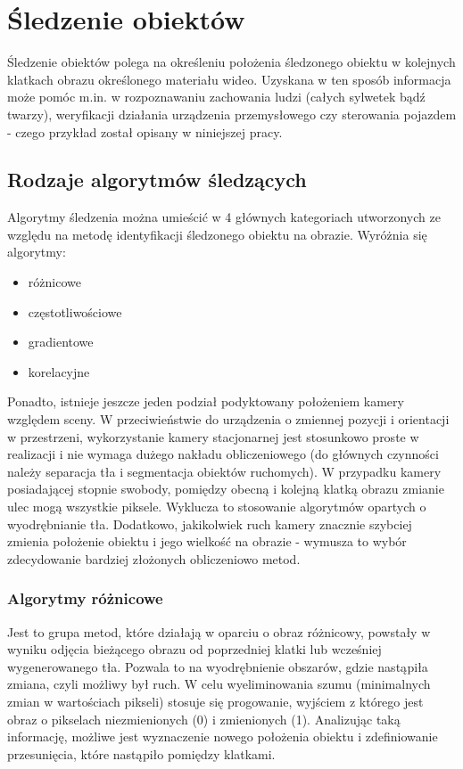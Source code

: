 \chapter{Śledzenie obiektów}
\label{cha:sledzenieObiektow}

Śledzenie obiektów polega na określeniu położenia śledzonego obiektu w kolejnych klatkach obrazu określonego materiału wideo. Uzyskana w ten sposób informacja może pomóc m.in. w rozpoznawaniu zachowania ludzi (całych sylwetek bądź twarzy), weryfikacji działania urządzenia przemysłowego czy sterowania pojazdem - czego przykład został opisany w niniejszej pracy.


\section{Rodzaje algorytmów śledzących}
\label{sec:algorytmySledzace}

Algorytmy śledzenia można umieścić w 4 głównych kategoriach utworzonych ze względu na metodę identyfikacji śledzonego obiektu na obrazie. Wyróżnia się algorytmy:
\begin{itemize}
	\item różnicowe
	\item częstotliwościowe
	\item gradientowe
	\item korelacyjne
\end{itemize}

Ponadto, istnieje jeszcze jeden podział podyktowany położeniem kamery względem sceny. W przeciwieństwie do urządzenia o zmiennej pozycji i orientacji w przestrzeni, wykorzystanie kamery stacjonarnej jest stosunkowo proste w realizacji i nie wymaga dużego nakładu obliczeniowego (do głównych czynności należy separacja tła i segmentacja obiektów ruchomych). W przypadku kamery posiadającej stopnie swobody, pomiędzy obecną i kolejną klatką obrazu zmianie ulec mogą wszystkie piksele. Wyklucza to stosowanie algorytmów opartych o wyodrębnianie tła. Dodatkowo, jakikolwiek ruch kamery  znacznie szybciej zmienia położenie obiektu i jego wielkość na obrazie - wymusza to wybór zdecydowanie bardziej złożonych obliczeniowo metod.

\subsection{Algorytmy różnicowe}
Jest to grupa metod, które działają w oparciu o obraz różnicowy, powstały w wyniku odjęcia bieżącego obrazu od poprzedniej klatki lub wcześniej wygenerowanego tła. Pozwala to na wyodrębnienie obszarów, gdzie nastąpiła zmiana, czyli możliwy był ruch. W celu wyeliminowania szumu (minimalnych zmian w wartościach pikseli) stosuje się progowanie, wyjściem z którego jest obraz o pikselach niezmienionych (0) i zmienionych (1). Analizując taką informację, możliwe jest wyznaczenie nowego położenia obiektu i zdefiniowanie przesunięcia, które nastąpiło pomiędzy klatkami. 

